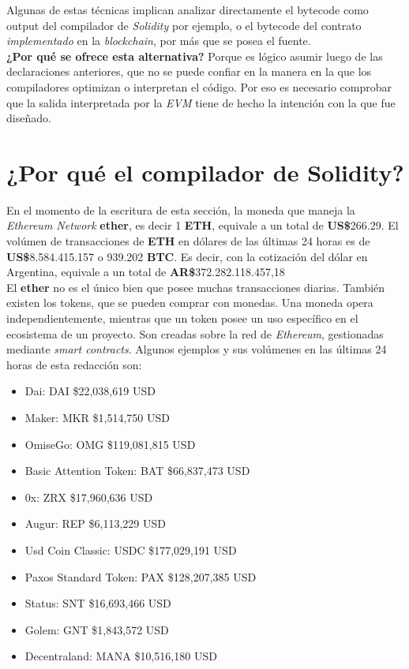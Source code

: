 Algunas de estas técnicas implican analizar directamente el bytecode como output del compilador de \textit{Solidity} por ejemplo, o el bytecode del contrato \textit{implementado} en la \textit{blockchain}, por más que se posea el fuente.\\

\textbf{¿Por qué se ofrece esta alternativa?} Porque es lógico asumir luego de las declaraciones anteriores, que no se puede confiar en la manera en la que los compiladores optimizan o interpretan el código. Por eso es necesario comprobar que la salida interpretada por la \textit{EVM} tiene de hecho la intención con la que fue diseñado.

\section{¿Por qué el compilador de Solidity?}
\label{sect:marco:porquesolidity}

En el momento de la escritura de esta sección, la moneda que maneja la \textit{Ethereum Network} \textbf{ether}, es decir 1 \textbf{ETH}, equivale a un total de \textbf{US\$}266.29. El volúmen de transacciones de \textbf{ETH} en dólares de las últimas 24 horas es de \textbf{US\$}8.584.415.157 o 939.202 \textbf{BTC}. Es decir, con la cotización del dólar en Argentina, equivale a un total de \textbf{AR\$}372.282.118.457,18\cite{coinmarketcap}\\

El \textbf{ether} no es el único bien que posee muchas transacciones diarias. También existen los tokens, que se pueden comprar con monedas. Una moneda opera independientemente, mientras que un token posee un uso específico en el ecosistema de un proyecto. Son creadas sobre la red de \textit{Ethereum}, gestionadas mediante \textit{smart contracts}. Algunos ejemplos y sus volúmenes en las últimas 24 horas de esta redacción son:

\begin{itemize}
    \item Dai: DAI \$22,038,619 USD 
    \item Maker: MKR \$1,514,750 USD 
    \item OmiseGo: OMG \$119,081,815 USD 
    \item Basic Attention Token: BAT \$66,837,473 USD
    \item 0x: ZRX \$17,960,636 USD 
    \item Augur: REP \$6,113,229 USD
    \item Usd Coin Classic: USDC \$177,029,191 USD
    \item Paxos Standard Token: PAX \$128,207,385 USD
    \item Status: SNT \$16,693,466 USD
    \item Golem: GNT \$1,843,572 USD 
    \item Decentraland: MANA \$10,516,180 USD
\end{itemize}


